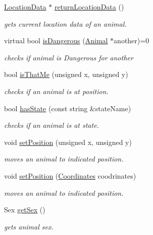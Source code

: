 \begin{DoxyCompactItemize}
\hyperlink{struct_location_data}{Location\+Data} $\ast$ \hyperlink{class_animal_af354475eac6d2f1edb0822d8ee3953df}{return\+Location\+Data} ()
\begin{DoxyCompactList}\small\item\em gets current location data of an animal. \end{DoxyCompactList}\item 
virtual bool \hyperlink{class_animal_a8d6a4aef56a2df828c8b286d993c3037}{is\+Dangerous} (\hyperlink{class_animal}{Animal} $\ast$another)=0
\begin{DoxyCompactList}\small\item\em checks if animal is Dangerous for another \end{DoxyCompactList}\item 
bool \hyperlink{class_animal_aae84f5e4412829e71f73c262600be323}{is\+That\+Me} (unsigned x, unsigned y)
\begin{DoxyCompactList}\small\item\em checks if an animal is at position. \end{DoxyCompactList}\item 
bool \hyperlink{class_animal_ad15c619e0b16bd89d8d38360f983955a}{has\+State} (const string \&state\+Name)
\begin{DoxyCompactList}\small\item\em checks if an animal is at state. \end{DoxyCompactList}\item 
void \hyperlink{class_animal_a5694a379251e01647fc8b3a8dd9bb21b}{set\+Position} (unsigned x, unsigned y)
\begin{DoxyCompactList}\small\item\em moves an animal to indicated position. \end{DoxyCompactList}\item 
void \hyperlink{class_animal_ad995dd1464ec7d41ff3ac8244aa8085a}{set\+Position} (\hyperlink{struct_coordinates}{Coordinates} coodrinates)
\begin{DoxyCompactList}\small\item\em moves an animal to indicated position. \end{DoxyCompactList}\item 
Sex \hyperlink{class_animal_a6d282165027bf10170923c6c87b01f01}{get\+Sex} ()
\begin{DoxyCompactList}\small\item\em gets animal sex. \end{DoxyCompactList}\item 

\end{DoxyCompactItemize}
